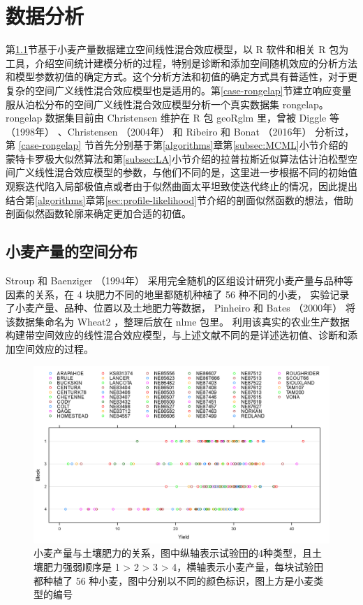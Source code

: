 \documentclass[12pt,a4paper,UTF8,twoside]{book}
\theoremstyle{definition}
\theoremstyle{definition}
\theoremstyle{definition}
\theoremstyle{remark}
\begin{document}
\hypertarget{applications}{%
\chapter{数据分析}\label{applications}}

第\ref{sec:spatial-random-effects}节基于小麦产量数据建立空间线性混合效应模型，以
R 软件和相关 R
包为工具，介绍空间统计建模分析的过程，特别是诊断和添加空间随机效应的分析方法和模型参数初值的确定方式。这个分析方法和初值的确定方式具有普适性，对于更复杂的空间广义线性混合效应模型也是适用的。第\ref{case-rongelap}节建立响应变量服从泊松分布的空间广义线性混合效应模型分析一个真实数据集
rongelap。rongelap 数据集目前由 Christensen 维护在 R 包 geoRglm 里，曾被
Diggle 等 （1998年） \citep{Diggle1998} 、Christensen （2004年）
\citep{Christensen2004} 和 Ribeiro 和 Bonat （2016年）
\citep{Bonat2016Practical} 分析过，第 \ref{case-rongelap}
节首先分别基于第\ref{algorithms}章第\ref{subsec:MCML}小节介绍的蒙特卡罗极大似然算法和第\ref{subsec:LA}小节介绍的拉普拉斯近似算法估计泊松型空间广义线性混合效应模型的参数，与他们不同的是，这里进一步根据不同的初始值观察迭代陷入局部极值点或者由于似然曲面太平坦致使迭代终止的情况，因此提出结合第\ref{algorithms}章第\ref{sec:profile-likelihood}节介绍的剖面似然函数的想法，借助剖面似然函数轮廓来确定更加合适的初值。

\hypertarget{sec:spatial-random-effects}{%
\section{小麦产量的空间分布}\label{sec:spatial-random-effects}}

Stroup 和 Baenziger （1994年） \citep{Stroup1994}
采用完全随机的区组设计研究小麦产量与品种等因素的关系，在 4
块肥力不同的地里都随机种植了 56 种不同的小麦，
实验记录了小麦产量、品种、位置以及土地肥力等数据， Pinheiro 和 Bates
（2000年） \citep{Pinheiro2000} 将该数据集命名为 Wheat2 ，整理后放在
nlme 包里。
利用该真实的农业生产数据构建带空间效应的线性混合效应模型，与上述文献不同的是详述选初值、诊断和添加空间效应的过程。

\begin{figure}

{\centering \includegraphics[width=0.7\linewidth]{figures/Yields-Block} 

}

\caption{小麦产量与土壤肥力的关系，图中纵轴表示试验田的4种类型，且土壤肥力强弱顺序是 1 > 2 > 3 > 4，横轴表示小麦产量，每块试验田都种植了 56 种小麦，图中分别以不同的颜色标识，图上方是小麦类型的编号}\label{fig:yields-block}
\end{figure}
\end{document}
